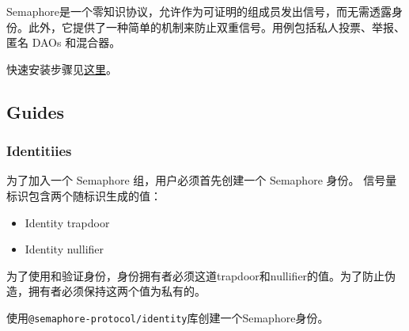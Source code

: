 \documentclass[10pt]{ctexart}
\begin{document}
Semaphore是一个零知识协议，允许作为可证明的组成员发出信号，而无需透露身份。此外，它提供了一种简单的机制来防止双重信号。用例包括私人投票、举报、匿名 DAOs 和混合器。

快速安装步骤见\href{https://semaphore.appliedzkp.org/docs/quick-setup}{这里}。
\subsection{Guides}
\subsubsection{Identitiies}
为了加入一个 Semaphore 组，用户必须首先创建一个 Semaphore 身份。 信号量标识包含两个随标识生成的值：
\begin{itemize}
	\item Identity trapdoor
	\item Identity nullifier
\end{itemize}
为了使用和验证身份，身份拥有者必须这道trapdoor和nullifier的值。为了防止伪造，拥有者必须保持这两个值为私有的。

使用\verb|@semaphore-protocol/identity|库创建一个Semaphore身份。
\end{document}

